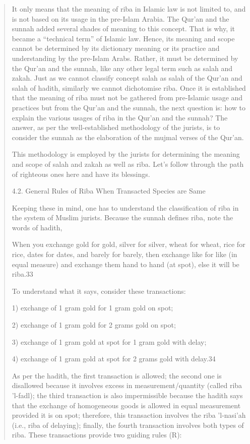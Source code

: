 \begin{quote}
It only means that the meaning of riba in Islamic law is not limited to, and is not based on its usage in the pre-Islam Arabia. The Qur'an and the sunnah added several shades of meaning to this concept. That is why, it became a “technical term” of Islamic law. Hence, its meaning and scope cannot be determined by its dictionary meaning or its practice and understanding by the pre-Islam Arabs. Rather, it must be determined by the Qur'an and the sunnah, like any other legal term such as salah and zakah. Just as we cannot classify concept salah as salah of the Qur'an and salah of hadith, similarly we cannot dichotomise riba. Once it is established that the meaning of riba must not be gathered from pre-Islamic usage and practices but from the Qur'an and the sunnah, the next question is: how to explain the various usages of riba in the Qur'an and the sunnah? The answer, as per the well-established methodology of the jurists, is to consider the sunnah as the elaboration of the mujmal verses of the Qur'an.

This methodology is employed by the jurists for determining the meaning and scope of salah and zakah as well as riba. Let's follow through the path of righteous ones here and have its blessings.

4.2. General Rules of Riba When Transacted Species are Same

Keeping these in mind, one has to understand the classification of riba in the system of Muslim jurists. Because the sunnah defines riba, note the words of hadith,

When you exchange gold for gold, silver for silver, wheat for wheat, rice for rice, dates for dates, and barely for barely, then exchange like for like (in equal measure) and exchange them hand to hand (at spot), else it will be riba.33

To understand what it says, consider these transactions:

1) exchange of 1 gram gold for 1 gram gold on spot;

2) exchange of 1 gram gold for 2 grams gold on spot;

3) exchange of 1 gram gold at spot for 1 gram gold with delay;

4) exchange of 1 gram gold at spot for 2 grams gold with delay.34

As per the hadith, the first transaction is allowed; the second one is disallowed because it involves excess in measurement/quantity (called riba 'l-fadl); the third transaction is also impermissible because the hadith says that the exchange of homogeneous goods is allowed in equal measurement provided it is on spot; therefore, this transaction involves the riba 'l-nasi'ah (i.e., riba of delaying); finally, the fourth transaction involves both types of riba. These transactions provide two guiding rules (R):


\end{quote}
